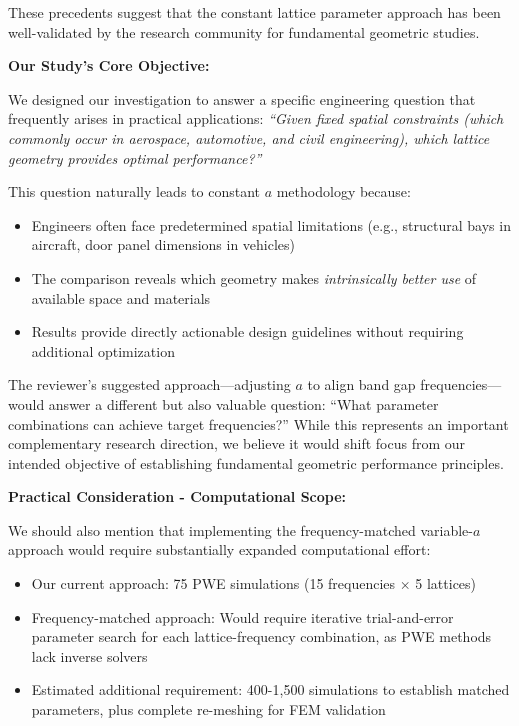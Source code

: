 \documentclass[11pt,a4paper]{article}
\newenvironment{responsebox}{%
    \par\medskip\noindent{\color{responsecolor}\rule{\linewidth}{2pt}}\par
    \noindent{\color{responsecolor}\bfseries Response}\par\smallskip
}{%
    \par\noindent{\color{responsecolor}\rule{\linewidth}{0.5pt}}\medskip
}
\begin{document}
\begin{responsebox}
These precedents suggest that the constant lattice parameter approach has been well-validated by the research community for fundamental geometric studies.

\textbf{Our Study's Core Objective:}

We designed our investigation to answer a specific engineering question that frequently arises in practical applications: \textit{``Given fixed spatial constraints (which commonly occur in aerospace, automotive, and civil engineering), which lattice geometry provides optimal performance?''}

This question naturally leads to constant $a$ methodology because:

\begin{itemize}
    \item Engineers often face predetermined spatial limitations (e.g., structural bays in aircraft, door panel dimensions in vehicles)
    \item The comparison reveals which geometry makes \textit{intrinsically better use} of available space and materials
    \item Results provide directly actionable design guidelines without requiring additional optimization
\end{itemize}

The reviewer's suggested approach—adjusting $a$ to align band gap frequencies—would answer a different but also valuable question: ``What parameter combinations can achieve target frequencies?'' While this represents an important complementary research direction, we believe it would shift focus from our intended objective of establishing fundamental geometric performance principles.

\textbf{Practical Consideration - Computational Scope:}

We should also mention that implementing the frequency-matched variable-$a$ approach would require substantially expanded computational effort:

\begin{itemize}
    \item Our current approach: 75 PWE simulations (15 frequencies $\times$ 5 lattices)
    \item Frequency-matched approach: Would require iterative trial-and-error parameter search for each lattice-frequency combination, as PWE methods lack inverse solvers
    \item Estimated additional requirement: 400-1,500 simulations to establish matched parameters, plus complete re-meshing for FEM validation
\end{itemize}


\end{responsebox}
\end{document}
